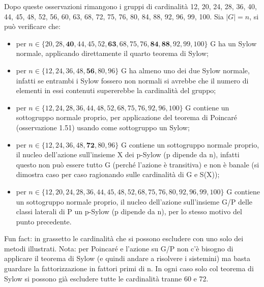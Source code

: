 \documentclass[11pt]{scrartcl}
\begin{document}
Dopo queste osservazioni rimangono i gruppi di cardinalità 12, 20, 24, 28, 36, 40, 44, 45, 48, 52, 56, 60, 63, 68, 72, 75, 76, 80, 84, 88, 92, 96, 99, 100.
Sia $|G|=n$, si può verificare che:
\begin{itemize}
    \item per $n \in \{20, 28, \mathbf{40}, 44, 45, 52, \mathbf{63}, 68, 75, 76, \mathbf{84}, \mathbf{88}, 92, 99, 100\}$ G ha un Sylow normale, applicando direttamente il quarto teorema di Sylow;
    \item per $n \in \{12, 24, 36, 48, \mathbf{56}, 80, 96\}$ G ha almeno uno dei due Sylow normale, infatti se entrambi i Sylow fossero non normali si avrebbe che il numero di elementi in essi contenuti supererebbe la cardinalità del gruppo;
    \item per $n \in \{12, 24, 28, 36, 44, 48, 52, 68, 75, 76, 92, 96, 100\}$ G contiene un sottogruppo normale proprio, per applicazione del teorema di Poincaré (osservazione 1.51) usando come sottogruppo un Sylow;
    \item per $n \in \{12, 24, 36, 48, \mathbf{72}, 80, 96\}$ G contiene un sottogruppo normale proprio, il nucleo dell'azione sull'insieme X dei p-Sylow (p dipende da n), infatti questo non può essere tutto G (perché l'azione è transitiva) e non è banale (si dimostra caso per caso ragionando sulle cardinalità di G e S(X));
    \item per  $n \in \{12, 20, 24, 28, 36, 44, 45, 48, 52, 68, 75, 76, 80, 92, 96, 99, 100\}$ G contiene un sottogruppo normale proprio, il nucleo dell'azione sull'insieme G/P delle classi laterali di P un p-Sylow (p dipende da n), per lo stesso motivo del punto precedente.
\end{itemize}
Fun fact: in grassetto le cardinalità che si possono escludere con uno solo dei metodi illustrati.
Nota: per Poincaré e l'azione su G/P non c'è bisogno di applicare il teorema di Sylow (e quindi andare a risolvere i sistemini) ma basta guardare la fattorizzazione in fattori primi di n.
In ogni caso solo col teorema di Sylow si possono già escludere tutte le cardinalità tranne 60 e 72.
\end{document}
